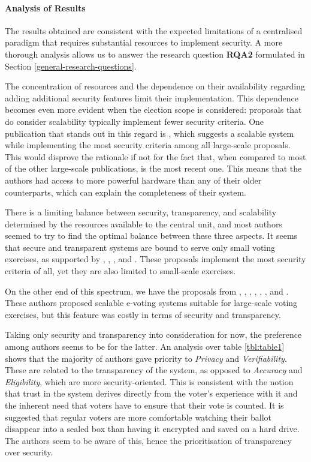 \documentclass[../access.tex]{subfiles}
\begin{document}
    \paragraph{Analysis of Results}
    \label{result-analysis-centralised}
    The results obtained are consistent with the expected limitations of a centralised paradigm that requires substantial resources to implement security. A more thorough analysis allows us to answer the research question \textbf{RQA2} formulated in Section \ref{general-research-questions}.
    \par
    The concentration of resources and the dependence on their availability regarding adding additional security features limit their implementation. This dependence becomes even more evident when the election scope is considered: proposals that do consider scalability typically implement fewer security criteria. One publication that stands out in this regard is \cite{Joaquim2003}, which suggests a scalable system while implementing the most security criteria among all large-scale proposals. This would disprove the rationale if not for the fact that, when compared to most of the other large-scale publications, \cite{Joaquim2003} is the most recent one. This means that the authors had access to more powerful hardware than any of their older counterparts, which can explain the completeness of their system.
    \par
    There is a limiting balance between security, transparency, and scalability determined by the resources available to the central unit, and most authors seemed to try to find the optimal balance between these three aspects. It seems that secure and transparent systems are bound to serve only small voting exercises, as supported by \cite{Cranor2002}, \cite{Nurmi1991}, \cite{Niemi1999}, and \cite{Iversen1992}. These proposals implement the most security criteria of all, yet they are also limited to small-scale exercises.
    \par
    On the other end of this spectrum, we have the proposals from \cite{Benaloh1994}, \cite{Benaloh1986a}, \cite{Sako1994}, \cite{Park1994}, \cite{Okamoto1996}, \cite{Okamoto1998}, and \cite{Moran2006}. These authors proposed scalable e-voting systems suitable for large-scale voting exercises, but this feature was costly in terms of security and transparency.
    \par
    Taking only security and transparency into consideration for now, the preference among authors seems to be for the latter. An analysis over table \ref{tbl:table1} shows that the majority of authors gave priority to \textit{Privacy} and \textit{Verifiability}. These are related to the transparency of the system, as opposed to \textit{Accuracy} and \textit{Eligibility}, which are more security-oriented. This is consistent with the notion that trust in the system derives directly from the voter's experience with it and the inherent need that voters have to ensure that their vote is counted. It is suggested that regular voters are more comfortable watching their ballot disappear into a sealed box than having it encrypted and saved on a hard drive. The authors seem to be aware of this, hence the prioritisation of transparency over security.
\end{document}
